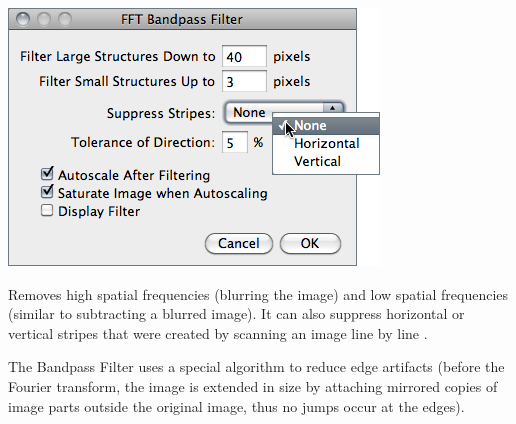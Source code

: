 \begin{minipage}[c][1\totalheight][t]{0.51\columnwidth}%
\includegraphics[scale=0.55]{images/FFTBandpassFilter}%
\end{minipage}%
\begin{minipage}[c][1\totalheight][t]{0.49\columnwidth}%
Removes high spatial frequencies (blurring the image) and low spatial
frequencies (similar to subtracting a blurred image). It can also
suppress horizontal or vertical stripes that were created by scanning
an image line by line \cite{C-FFTfilter}.\medskip{}


The Bandpass Filter uses a special algorithm to reduce edge artifacts
(before the Fourier transform, the image is extended in size by attaching
mirrored copies of image parts outside the original image, thus no
jumps occur at the edges).%
\end{minipage}
